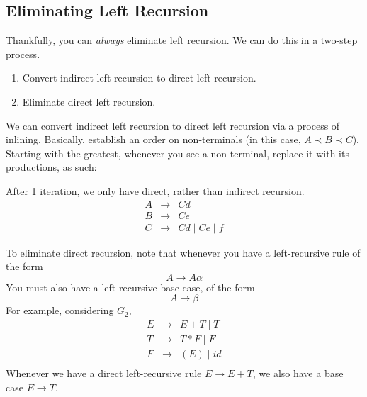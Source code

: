 \subsection{Eliminating Left Recursion}
Thankfully, you can \textit{always} eliminate left recursion. We can do this in a two-step process.

\begin{enumerate}
    \item Convert indirect left recursion to direct left recursion.
    \item Eliminate direct left recursion.
\end{enumerate}

We can convert indirect left recursion to direct left recursion via a process of inlining. Basically, establish an order on non-terminals (in this case, $A \prec B \prec C$). Starting with the greatest, whenever you see a non-terminal, replace it with its productions, as such:

After 1 iteration, we only have direct, rather than indirect recursion.
\[\begin{array}{lcl}
     A & \rightarrow & Cd  \\
     B & \rightarrow & Ce \\
     C & \rightarrow & Cd \mid Ce \mid f
\end{array}\]

To eliminate direct recursion, note that whenever you have a left-recursive rule of the form
\[ A \rightarrow A\alpha \]
You must also have a left-recursive base-case, of the form
\[A \rightarrow \beta \]
For example, considering $G_2$,
\[
\begin{array}{rcl}
E &\to& E + T \mid T\\
T &\to& T * F \mid F\\
F &\to& (E) \mid id\\
\end{array}
\]
Whenever we have a direct left-recursive rule $E \to E + T$, we also have a base case $E \to T$.

